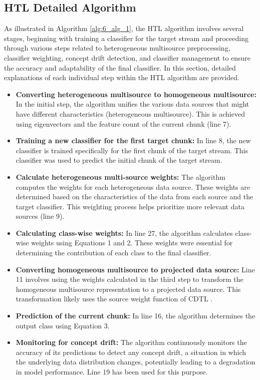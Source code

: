 \subsection{HTL Detailed Algorithm}

As illustrated in Algorithm \ref{alg:6_alg_1}, the HTL algorithm involves several stages, beginning with training a classifier for the target stream and proceeding through various steps related to heterogeneous multisource preprocessing, classifier weighting, concept drift detection, and classifier management to ensure the accuracy and adaptability of the final classifier. In this section, detailed explanations of each individual step within the HTL algorithm are provided.
\begin{itemize}
	\item \textbf{Converting heterogeneous multisource to homogeneous multisource:} In the initial step, the algorithm unifies the various data sources that might have different characteristics (heterogeneous multisource). This is achieved using eigenvectors and the feature count of the current chunk (line 7).
	\item \textbf{Training a new classifier for the first target chunk:} In line 8, the new classifier is trained specifically for the first chunk of the target stream. This classifier was used to predict the initial chunk of the target stream.
	\item \textbf{Calculate heterogeneous multi-source weights:} The algorithm computes the weights for each heterogeneous data source. These weights are determined based on the characteristics of the data from each source and the target classifier. This weighting process helps prioritize more relevant data sources (line 9).
	\item \textbf{Calculating class-wise weights:} In line 27, the algorithm calculates class-wise weights using Equations 1 and 2. These weights were essential for determining the contribution of each class to the final classifier.
	\item \textbf{Converting homogeneous multisource to projected data source:} Line 11 involves using the weights calculated in the third step to transform the homogeneous multisource representation to a projected data source. This transformation likely uses the source weight function of CDTL \cite{yang2021concept}.
	\item \textbf{Prediction of the current chunk:} In line 16, the algorithm determines the output class using Equation 3.
	\item \textbf{Monitoring for concept drift:} The algorithm continuously monitors the accuracy of its predictions to detect any concept drift, a situation in which the underlying data distribution changes, potentially leading to a degradation in model performance. Line 19 has been used for this purpose.

\end{itemize}
